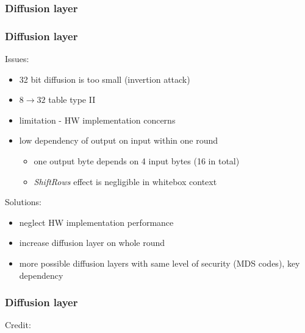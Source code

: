 \documentclass{beamer}
\begin{document}
\subsubsection{Diffusion layer}
\begin{frame}
    \frametitle{Diffusion layer}
    Issues:
    \begin{itemize}
     \item 32 bit diffusion is too small (invertion attack)
     \item $8 \rightarrow 32$ table type II
     \item limitation - HW implementation concerns
     \item low dependency of output on input within one round
     \begin{itemize}
      \item one output byte depends on 4 input bytes (16 in total)
      \item \emph{ShiftRows} effect is negligible in whitebox context
     \end{itemize}
    \end{itemize}
    
    \medskip
    Solutions:
    \begin{itemize}
     \item neglect HW implementation performance
     \item increase diffusion layer on whole round
     \item more possible diffusion layers with same level of security (MDS codes), key dependency
    \end{itemize}
\end{frame}

\begin{frame}
    \frametitle{Diffusion layer}
    \centerline{}
    \centerline{\hbox{\tiny Credit:}}
\end{frame}
\end{document}
